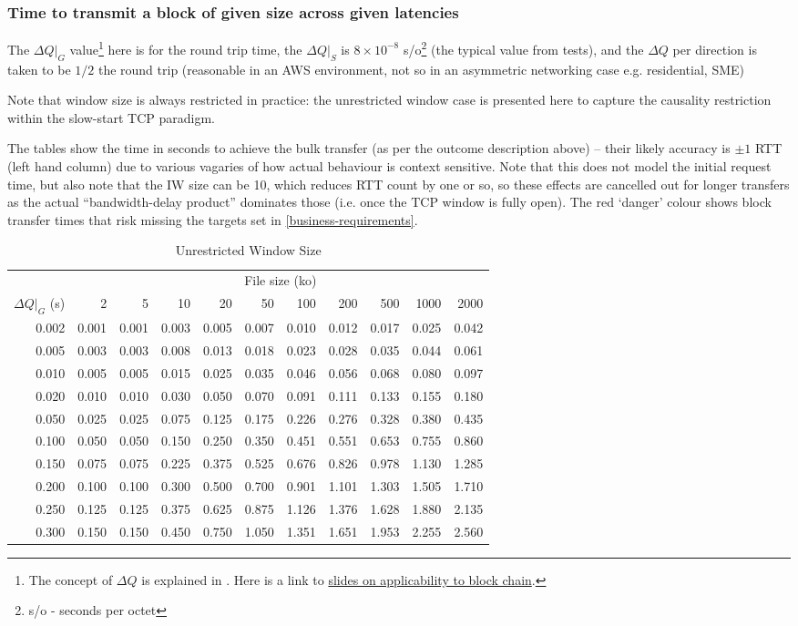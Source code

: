 \documentclass[11pt,a4paper]{article}
\begin{document}
\subsubsection{Time to transmit a block of given size across given latencies}
\label{time-to-transmit-a-block-of-given-size-across-given-latencies}

The $\Delta{}Q|_G$ value\footnote{The concept of $\Delta{}Q$ is
  explained in \cite{Comp20}. Here is a link to
  \href{https://www.slideshare.net/pnsol-slides/q-and-blockchain-83943683}{{slides
  on applicability to block chain}}.} here is for the round trip time,
the $\Delta{}Q|_S$ is $8\times{}10^{-8}$ s/o\footnote{s/o - seconds per octet}
(the typical value from tests), and the $\Delta{}Q$ per direction is taken to
be $1/2$ the round trip (reasonable in an AWS environment, not so in an
asymmetric networking case e.g. residential, SME)

Note that window size is always restricted in practice: the unrestricted
window case is presented here to capture the causality restriction
within the slow-start TCP paradigm.

The tables show the time in seconds to achieve the bulk transfer (as per
the outcome description above) -- their likely accuracy is $\pm 1$ RTT (left
hand column) due to various vagaries of how actual behaviour is context
sensitive. Note that this does not model the initial request time, but
also note that the IW size can be 10, which reduces RTT count by one or
so, so these effects are cancelled out for longer transfers as the
actual ``bandwidth-delay product'' dominates those (i.e. once the TCP
window is fully open). The red `danger' colour shows block transfer
times that risk missing the targets set in \cref{business-requirements}.

\begin{table}
\begin{longtable}[]{r|rrrrrrrrrr}
\toprule
  \caption{Unrestricted Window Size}\tabularnewline
\midrule
                     & \multicolumn{10}{c}{File size (ko)}\tabularnewline
  $\Delta{}Q|_G$ (s) & 2 & 5 & 10 & 20 & 50 & 100 & 200 & 500 & 1000 & 2000\tabularnewline
\midrule
\endhead
0.002 & 0.001 & 0.001 & 0.003 & 0.005 & 0.007 & 0.010 & 0.012 & 0.017 &
0.025 & 0.042\tabularnewline
0.005 & 0.003 & 0.003 & 0.008 & 0.013 & 0.018 & 0.023 & 0.028 & 0.035 &
0.044 & 0.061\tabularnewline
0.010 & 0.005 & 0.005 & 0.015 & 0.025 & 0.035 & 0.046 & 0.056 & 0.068 &
0.080 & 0.097\tabularnewline
0.020 & 0.010 & 0.010 & 0.030 & 0.050 & 0.070 & 0.091 & 0.111 & 0.133 &
0.155 & 0.180\tabularnewline
0.050 & 0.025 & 0.025 & 0.075 & 0.125 & 0.175 & 0.226 & 0.276 & 0.328 &
0.380 & 0.435\tabularnewline
0.100 & 0.050 & 0.050 & 0.150 & 0.250 & 0.350 & 0.451 & 0.551 & 0.653 &
0.755 & 0.860\tabularnewline
0.150 & 0.075 & 0.075 & 0.225 & 0.375 & 0.525 & 0.676 & 0.826 & 0.978 &
1.130 & 1.285\tabularnewline
0.200 & 0.100 & 0.100 & 0.300 & 0.500 & 0.700 & 0.901 & 1.101 & 1.303 &
1.505 & 1.710\tabularnewline
0.250 & 0.125 & 0.125 & 0.375 & 0.625 & 0.875 & 1.126 & 1.376 & 1.628 &
1.880 & 2.135\tabularnewline
0.300 & 0.150 & 0.150 & 0.450 & 0.750 & 1.050 & 1.351 & 1.651 & 1.953 &
2.255 & 2.560\tabularnewline
\bottomrule
\end{longtable}
\end{table}
\end{document}
